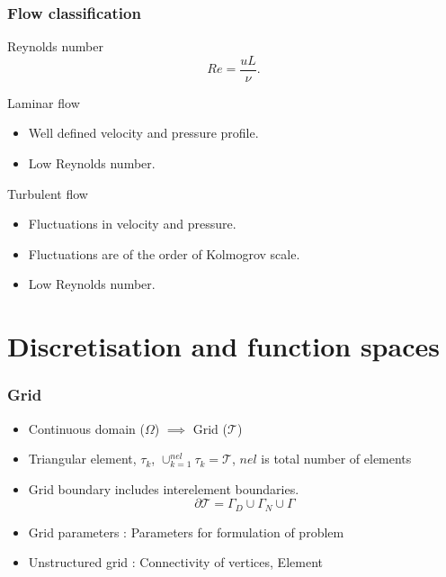 \documentclass{beamer}
\begin{document}

\begin{frame}
\frametitle{Flow classification}
\begin{block}{Reynolds number}
\begin{equation} \label{reynolds_number}
Re =  \frac{uL}{\nu} \textrm{.}
\end{equation}
\end{block}
\begin{block}{Laminar flow}
\begin{itemize}
\item Well defined velocity and pressure profile.
\item Low Reynolds number.
\end{itemize}
\end{block}
\begin{block}{Turbulent flow}
\begin{itemize}
\item Fluctuations in velocity and pressure.
\item Fluctuations are of the order of Kolmogrov scale.
\item Low Reynolds number.
\end{itemize}
\end{block}
\end{frame}


\section{Discretisation and function spaces} %

\begin{frame}
\frametitle{Grid}
\begin{itemize}
\item Continuous domain ($\Omega$) $\implies$ Grid ($\mathcal{T}$)
\item Triangular element, $\tau_k$, $\cup_{k=1}^{nel} \tau_k = \mathcal{T}$, $nel$ is total number of elements
\item Grid boundary includes interelement boundaries.
\begin{equation}
\partial \mathcal{T} = \Gamma_D \cup \Gamma_N \cup \Gamma
\end{equation}
\item Grid parameters : Parameters for formulation of problem
\item Unstructured grid : Connectivity of vertices, Element
\end{itemize}
\end{frame}
\end{document}
